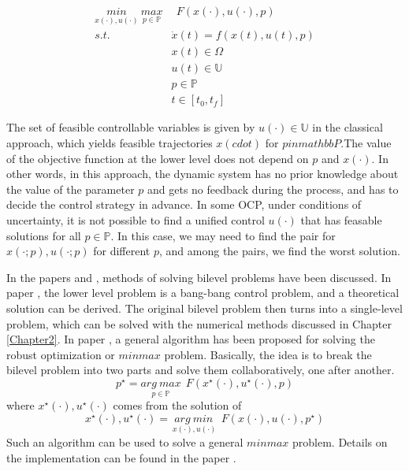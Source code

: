 \documentclass  [
  paper    = a4,
  BCOR     = 10mm,
  twoside,
  fontsize = 12pt,
  fleqn,
  toc      = bibnumbered,
  toc      = listofnumbered,
  numbers  = noendperiod,
  headings = normal,
  listof   = leveldown,
  version  = 3.03
]                                       {scrreprt}
\newcommand{\<}{\langle}
\renewcommand{\>}{\rangle}
\begin{document}
\begin{equation}
	\begin{aligned}
		\underset{x(\cdot), u(\cdot)}{min} \   \underset{p  \in   \mathbb{P} }{max} & \ \ F(x(\cdot), u(\cdot), p)\\ 
	s.t.\ \   &  \dot{x} (t) = f(x(t), u(t), p)\\ 
& x(t) \in \Omega \\
& u(t) \in \mathbb{U}  \\
& p  \in   \mathbb{P}  \\
& t \in [t_0, t_f]
	\end{aligned}
	\label{minmax}
\end{equation}

The set of feasible controllable variables is given by $u(\cdot) \in \mathbb{U}$ in the classical approach, which yields feasible trajectories $x(cdot)$ for $p in mathbbP$.The value of the objective function at the lower level does not depend on $p$ and $x(\cdot)$. In other words, in this approach, the dynamic system has no prior knowledge about the value of the parameter $p$ and gets no feedback during the process, and has to decide the control strategy in advance. In some OCP, under conditions of uncertainty, it is not possible to find a unified control $u(\cdot)$ that has feasable solutions for all $p \in  \mathbb{P}$. In this case, we may need to find the pair for $x(\cdot;p), u(\cdot;p)$ for different $p$, and among the pairs, we find the worst solution.


In the papers \cite{Mas14} and \cite{KM16}, methods of solving bilevel problems have been discussed. In paper \cite{KM16}, the lower level problem is a bang-bang control problem, and a theoretical solution can be derived. The original bilevel problem then turns into a single-level problem, which can be solved with the numerical methods discussed in Chapter \ref{Chapter2}. In paper \cite{Mas14}, a general algorithm has been proposed for solving the robust optimization or $minmax$ problem. Basically, the idea is to break the bilevel problem into two parts and solve them collaboratively, one after another.
\begin{equation}
	   p^\star = \underset{p \in  \mathbb{P} }{arg\ max}   \ \ F(x^\star(\cdot), u^\star(\cdot), p)
\end{equation}
where $x^\star(\cdot), u^\star(\cdot)$ comes from the solution of 
\begin{equation}
	x^\star(\cdot), u^\star(\cdot) = \underset{\ x(\cdot), u(\cdot)}{arg\ min}   \ \ F(x(\cdot), u(\cdot), p^\star)
\end{equation}
Such an algorithm can be used to solve a general $minmax$ problem. Details on the implementation can be found in the paper \cite{Mas14}.
\end{document}
